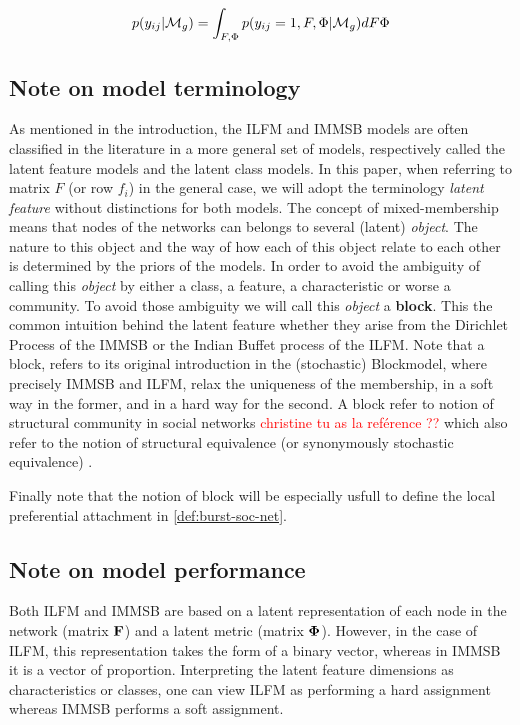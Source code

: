 \begin{equation}
p(y_{ij} | \mathcal{M}_g) = \int_{F,\Phi} p(y_{ij}=1, F,\Phi |\mathcal{M}_g) dF\Phi
\end{equation}

\subsection{Note on model terminology}
As mentioned in the introduction, the ILFM and IMMSB models are often classified in the literature in a more general set of models, respectively called the latent feature models and the latent class models. In this paper, when referring to matrix $F$ (or row $f_i$) in the general case, we will adopt the terminology  \emph{latent feature} without distinctions for both models. The concept of mixed-membership means that nodes of the networks can belongs to several (latent) \emph{object}. The nature to this object and the way of how each of this object relate to each other is determined by the priors of the models. In order to avoid the ambiguity of calling this \emph{object} by either a class, a feature, a characteristic or worse a community. To avoid those ambiguity we will call this \emph{object} a \textbf{block}. This the common intuition behind the latent feature whether they arise from the Dirichlet Process of the IMMSB or the Indian Buffet process of the ILFM. Note that a block, refers to its original introduction in the (stochastic) Blockmodel,  where precisely IMMSB and ILFM, relax the uniqueness of the membership, in a soft way in the former, and in a hard way for the second. A block refer to notion of structural community in social networks \textcolor{red}{christine tu as la reférence ??} which also refer to the notion of structural equivalence (or synonymously stochastic equivalence) \cite{goldenberg2010survey}.

Finally note that the notion of block will be especially usfull to define the local preferential attachment in \ref{def:burst-soc-net}.

\subsection{Note on model performance}

Both ILFM and IMMSB are based on a latent representation of each node in the network (matrix $\mathbf{F}$) and a latent metric (matrix $\mathbf{\Phi}$). However, in the case of ILFM, this representation takes the form of a binary vector, whereas in IMMSB it is a vector of proportion. Interpreting the latent feature dimensions as characteristics or classes, one can view ILFM as performing a hard assignment whereas IMMSB performs a soft assignment. 

